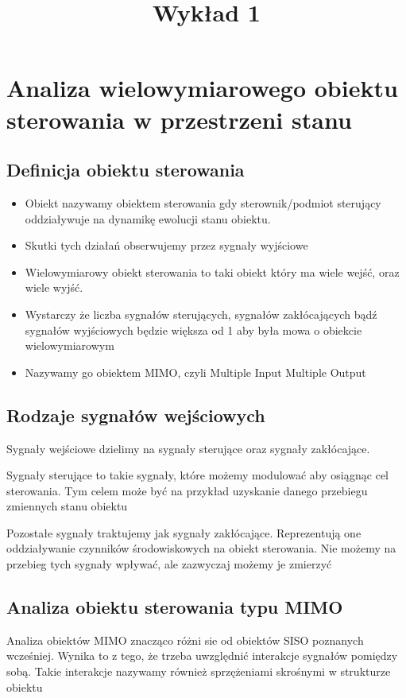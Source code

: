 \documentclass{article}
\title{Wykład 1}
\begin{document}
	\section{Analiza wielowymiarowego obiektu sterowania w przestrzeni stanu}

	\subsection{Definicja obiektu sterowania}
		\begin{itemize}
			\item Obiekt nazywamy obiektem sterowania gdy sterownik/podmiot sterujący oddziaływuje
			na dynamikę ewolucji stanu obiektu.
			\item Skutki tych działań obserwujemy przez sygnały wyjściowe
			\item Wielowymiarowy obiekt sterowania to taki obiekt który ma wiele wejść,
			oraz wiele wyjść.
			\item Wystarczy że liczba sygnałów sterujących, sygnałów zakłócających bądź sygnałów
			wyjściowych będzie większa od 1 aby była mowa o obiekcie wielowymiarowym
			\item Nazywamy go obiektem MIMO, czyli Multiple Input Multiple Output
		\end{itemize}
	\subsection{Rodzaje sygnałów wejściowych}

		Sygnały wejściowe dzielimy na sygnały sterujące oraz sygnały zakłócające.

		Sygnały sterujące to takie sygnały, które możemy modulować aby osiągnąc cel sterowania.
		Tym celem może być na przykład uzyskanie danego przebiegu zmiennych stanu obiektu

		Pozostałe sygnały traktujemy jak sygnały zakłócające. Reprezentują one oddziaływanie
		czynników środowiskowych na obiekt sterowania. Nie możemy na przebieg tych
		sygnały wpływać, ale zazwyczaj możemy je zmierzyć

	\subsection{Analiza obiektu sterowania typu MIMO}

	Analiza obiektów MIMO znacząco różni sie od obiektów SISO poznanych wcześniej.
	Wynika to z tego, że trzeba uwzględnić interakcje sygnałów pomiędzy sobą.
	Takie interakcje nazywamy również sprzężeniami skrośnymi w strukturze obiektu
\end{document}
